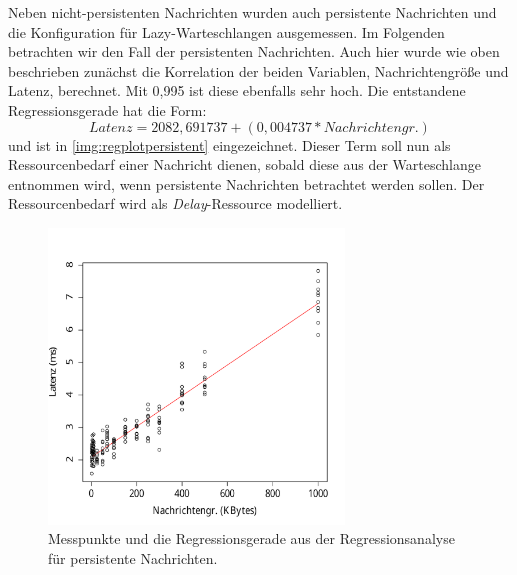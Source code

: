 \par
Neben nicht-persistenten Nachrichten wurden auch persistente Nachrichten und die Konfiguration für Lazy-Warteschlangen ausgemessen. Im Folgenden betrachten wir den Fall der persistenten Nachrichten. Auch hier wurde wie oben beschrieben zunächst die Korrelation der beiden Variablen, Nachrichtengröße und Latenz, berechnet. Mit 0,995 ist diese ebenfalls sehr hoch. Die entstandene Regressionsgerade hat die Form: \[Latenz = 2082,691737 + (0,004737 * Nachrichtengr.)\] und ist in \autoref{img:regplotpersistent} eingezeichnet. Dieser Term soll nun als Ressourcenbedarf einer Nachricht dienen, sobald diese aus der Warteschlange entnommen wird, wenn persistente Nachrichten betrachtet werden sollen. Der Ressourcenbedarf wird als \emph{Delay}-Ressource modelliert.

\begin{figure}[!ht]
\center
  \includegraphics[width=0.7\textwidth]{images/modelling/persistentRegression.pdf}
  \caption{Messpunkte und die Regressionsgerade aus der Regressionsanalyse für persistente Nachrichten.}
  \label{img:regplotpersistent}
\end{figure}

